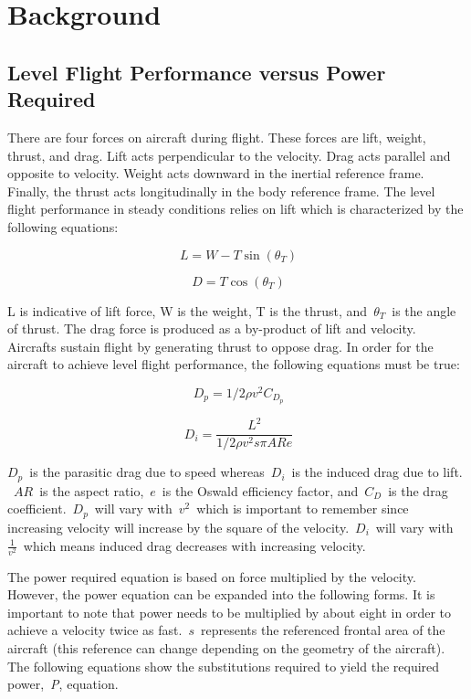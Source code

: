 \documentclass[conf]{new-aiaa}
\begin{document}
\section{Background}

\subsection{Level Flight Performance versus Power Required}

There are four forces on aircraft during flight. These forces are lift, weight, thrust, and drag. Lift acts perpendicular to the velocity. Drag acts parallel and opposite to velocity. Weight acts downward in the inertial reference frame. Finally, the thrust acts longitudinally in the body reference frame. The level flight performance in steady conditions relies on lift which is characterized by the following equations:

\begin{equation} \label{eq1}
\ L = W - T\sin(\theta_T)
\end{equation}

\begin{equation} \label{eq2}
\ D = T\cos(\theta_T)
\end{equation}

L is indicative of lift force, W is the weight, T is the thrust, and~$\theta_T$~is the angle of thrust. The drag force is produced as a by-product of lift and velocity. Aircrafts sustain flight by generating thrust to oppose drag. In order for the aircraft to achieve level flight performance, the following equations must be true:

\begin{equation} \label{eq3}
\ D_p = 1/2 \rho v^2 C_{D_p}
\end{equation}

\begin{equation} \label{eq4}
\ D_i = \frac{L^2}{1/2 \rho v^2 s \pi AR e}
\end{equation}

$D_{p}$~is the parasitic drag due to speed whereas~$D_{i}$~is the induced drag due to lift. ~$AR$~is the aspect ratio,~$e$~is the Oswald efficiency factor, and~$C_{D}$~is the drag coefficient.~$D_{p}$~will vary with~$v^{2}$~which is important to remember since increasing velocity will increase by the square of the velocity.~$D_{i}$~will vary with~$\frac{1}{v^2}$~which means induced drag decreases with increasing velocity.

The power required equation is based on force multiplied by the velocity. However, the power equation can be expanded into the following forms. It is important to note that power needs to be multiplied by about eight in order to achieve a velocity twice as fast.~$s$~represents the referenced frontal area of the aircraft (this reference can change depending on the geometry of the aircraft). The following equations show the substitutions required to yield the required power,~\textit{P}, equation.
\end{document}
